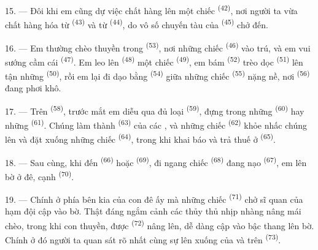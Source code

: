 15. --- Đôi khi em cũng dự việc chất hàng lên một chiếc 
\textsuperscript{(42)}, nơi người ta vừa chất hàng hóa từ 
\textsuperscript{(43)} và từ  \textsuperscript{(44)}, do vô số chuyến tàu
của  \textsuperscript{(45)} chở đến.

\VUsaut{3.0mm}
\VUsaut{3.0mm}

16. --- Em thường chèo thuyền trong  \textsuperscript{(53)}, nơi những
chiếc  \textsuperscript{(46)} vào trú, và em vui sướng cầm cái
 \textsuperscript{(47)}. Em leo lên 
\textsuperscript{(48)} một chiếc  \textsuperscript{(49)}, em bám
 \textsuperscript{(52)} trèo dọc 
\textsuperscript{(51)} lên tận những  \textsuperscript{(50)}, rồi em
lại đi dạo bằng  \textsuperscript{(54)} giữa những chiếc  \textsuperscript{(55)} nặng nề, nơi  \textsuperscript{(56)} đang
phơi khô.

17. --- Trên  \textsuperscript{(58)}, trước mắt em diễu qua đủ loại
 \textsuperscript{(59)}, đựng trong những 
\textsuperscript{(60)} hay những  \textsuperscript{(61)}. Chúng làm thành
 \textsuperscript{(63)} của các , và những chiếc
 \textsuperscript{(62)} khỏe nhấc chúng lên và đặt xuống những chiếc
 \textsuperscript{(64)}, trong khi  khai báo và trả
thuế ở  \textsuperscript{(65)}.

18. --- Sau cùng, khi đến  \textsuperscript{(66)} hoặc 
\textsuperscript{(69)}, đi ngang chiếc  \textsuperscript{(68)} đang nạo
 \textsuperscript{(67)}, em lên bờ ở đê, cạnh 
\textsuperscript{(70)}.

19. --- Chính ở phía bên kia của con đê ấy mà những chiếc 
\textsuperscript{(71)} chở sĩ quan của hạm đội cập vào bờ. Thật đáng ngắm cảnh các thủy
thủ nhịp nhàng nâng mái chèo, trong khi con thuyền, được 
\textsuperscript{(72)} nâng lên, dễ dàng cập vào bậc thang lên bờ. Chính ở đó người ta
quan sát rõ nhất  cùng sự lên xuống của  và
 trên  \textsuperscript{(73)}.


